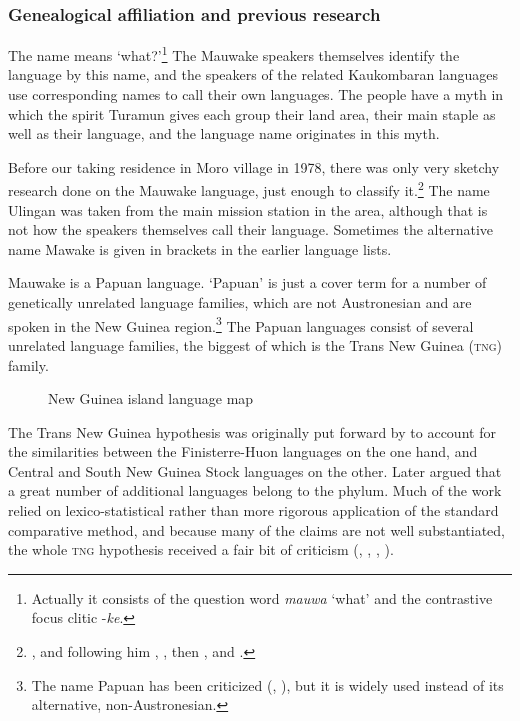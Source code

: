 \subsubsection{Genealogical affiliation and previous research}\label{sec:1.4.1:geneological}
The name  means `what?'\footnote{Actually it consists of the question word \textit{mauwa} `what' and the contrastive focus clitic -\textit{ke}.}  The Mauwake speakers themselves identify the language by this name, and the speakers of the related Kaukombaran languages use corresponding names to call their own languages.  The people have a myth in which the spirit Turamun gives each group their land area, their main staple as well as their language, and the language name originates in this myth.

Before our taking residence in Moro village in 1978, there was only very sketchy research done on the Mauwake language, just enough to classify it.\footnote{\citet{Capell1952}, and following him \citet{VoegelinEtAL1965}, \citet{Greenberg1971}, then \citet{ZGraggen1971,ZGraggen1975a}, \citet{Wurm1975,Wurm1982} and \citet{Hattori1981}.} The name Ulingan was taken from the main mission station in the area, although that is not how the speakers themselves call their language. Sometimes the alternative name Mawake is given in brackets in the earlier language lists.  

Mauwake is a Papuan language. `Papuan' is just a cover term for a number of genetically unrelated language families, which are not Austronesian and are spoken in the New Guinea region.\footnote{The name Papuan has been criticized (\citealt{Capell1969}, \citealt{Haiman1979}), but it is widely used instead of its alternative, non-Austronesian.} The Papuan languages consist of several unrelated language families, the biggest of which is the Trans New Guinea (\textsc{tng}) family.  


\begin{figure}
\caption{New Guinea island language map \citep[34 Map~2]{Ross2005}}
\label{map:2:NewGuineamap}
\end{figure}

The Trans New Guinea hypothesis was originally put forward by \citet{McElhanonEtAL1970} to account for the similarities between the Finisterre-Huon languages on the one hand, and Central and South New Guinea Stock languages on the other. Later \citet{Wurm1975} argued that a great number of additional languages belong to the phylum.  Much of the work relied on lexico-statistical rather than more rigorous application of the standard comparative method, and because many of the claims are not well substantiated, the whole \textsc{tng} hypothesis received a fair bit of criticism (\citealt{Lang1976}, \citealt{Haiman1979}, \citealt{Foley1986}, \citealt{Pawley1995}).

